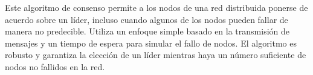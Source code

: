 Este algoritmo de consenso permite a los nodos de una red distribuida ponerse de acuerdo sobre un líder, incluso cuando algunos de los nodos pueden fallar de manera no predecible. Utiliza un enfoque simple basado en la transmisión de mensajes y un tiempo de espera para simular el fallo de nodos. El algoritmo es robusto y garantiza la elección de un líder mientras haya un número suficiente de nodos no fallidos en la red.
